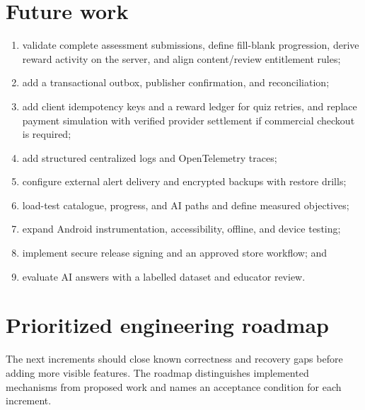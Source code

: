 \documentclass[12pt,a4paper,oneside]{report}
\begin{document}
\section{Future work}
\begin{enumerate}[leftmargin=*]
\item validate complete assessment submissions, define fill-blank progression,
derive reward activity on the server, and align content/review entitlement rules;
\item add a transactional outbox, publisher confirmation, and reconciliation;
\item add client idempotency keys and a reward ledger for quiz retries, and replace
payment simulation with verified provider settlement if commercial checkout is required;
\item add structured centralized logs and OpenTelemetry traces;
\item configure external alert delivery and encrypted backups with restore drills;
\item load-test catalogue, progress, and AI paths and define measured objectives;
\item expand Android instrumentation, accessibility, offline, and device testing;
\item implement secure release signing and an approved store workflow; and
\item evaluate AI answers with a labelled dataset and educator review.
\end{enumerate}

\section{Prioritized engineering roadmap}
The next increments should close known correctness and recovery gaps before adding
more visible features. The roadmap distinguishes implemented mechanisms from proposed
work and names an acceptance condition for each increment.
\end{document}
